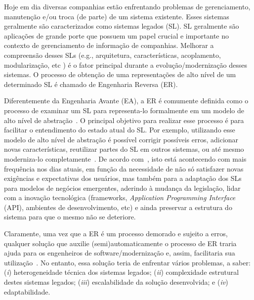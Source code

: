 Hoje em dia diversas companhias estão enfrentando problemas de gerenciamento, manutenção e/ou troca (de parte) de um sistema existente. Esses sistemas geralmente são caracterizados como sistemas legados (SL). SL geralmente são aplicações de grande porte que possuem um papel crucial e importante no contexto de gerenciamento de informação de companhias. Melhorar a compreensão desses SLs (e.g., arquitetura, características, acoplamento, modularização, etc ) é o fator principal durante a evolução/modernização desses sistemas. O processo de obtenção de uma representações de alto nível de um determinado SL é chamado de Engenharia Reversa (ER).

Diferentemente da Engenharia Avante (EA), a ER é comumente definida como o processo de examinar um SL para representa-lo formalmente em um modelo de alto nível de abstração~\citep{Reverse_engineering_and_Design_Recovery_A_Taxonomy}. O principal objetivo para realizar esse processo é para facilitar o entendimento do estado atual do SL. Por exemplo, utilizando esse modelo de alto nível de abstração é possível corrigir possíveis erros, adicionar novas características, reutilizar partes do SL em outros sistemas, ou até mesmo moderniza-lo completamente~\citep{Griffith2011}. De acordo com~\cite{Achievements_and_Challenges_in_Software_Reverse_Engineering}, isto está acontecendo com mais frequência nos dias atuais, em função da necessidade de não só satisfazer novas exigências e expectativas dos usuários, mas também para a adaptação dos SLs para modelos de negócios emergentes, aderindo à mudança da legislação, lidar com a inovação tecnológica (frameworks, \textit{Application Programming Interface} (API), ambientes de desenvolvimento, etc) e ainda preservar a estrutura do sistema para que o mesmo não se deteriore.

Claramente, uma vez que a ER é um processo demorado e sujeito a erros, qualquer solução que auxilie (semi)automaticamente o processo de ER traria ajuda para os engenheiros de software/modernização e, assim, facilitaria sua utilização~\citep{ADMCHAPTERR, ADMBook}. No entanto, essa solução teria de enfrentar vários problemas, a saber: (\textit{i}) heterogeneidade técnica dos sistemas legados; (\textit{ii}) complexidade estrutural destes sistemas legados; (\textit{iii}) escalabilidade da solução desenvolvida; e (\textit{iv}) edaptabilidade.

